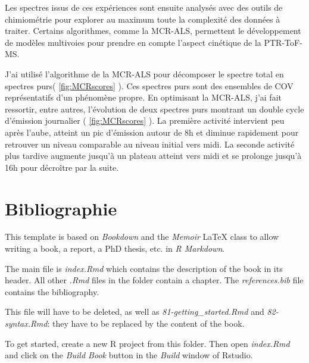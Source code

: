 \documentclass[
  12pt,
  american,
  a4paper,
  extrafontsizes,onecolumn,openright
  ]{memoir}
\makeatletter
\newcommand{\MemoirChapStyle}{daleif1}
\newcommand{\MemoirPageStyle}{Ruled}
\newlength\widthw %
\newcommand*{\SmallMargins}{
  \setlrmarginsandblock{1.5in}{1.5in}{*}
  \setmarginnotes{0.1in}{0.1in}{0.1in}
 \setulmarginsandblock{1.5in}{1in}{*}
  \checkandfixthelayout
  \ch@ngetext
  \clearpage
  \setlength{\widthw}{\textwidth+\marginparsep+\marginparwidth}
  \footnotesatfoot
  \chapterstyle{\MemoirChapStyle}	%
  \pagestyle{\MemoirPageStyle}
}
\makeatother
\begin{document}
\normalsize

Les spectres issus de ces expériences sont ensuite analysés avec des outils de chimiométrie pour explorer au maximum toute la complexité des données à traiter. Certains algorithmes, comme la MCR-ALS, permettent le développement de modèles multivoies pour prendre en compte l'aspect cinétique de la PTR-ToF-MS.

J'ai utilisé l'algorithme de la MCR-ALS pour décomposer le spectre total en spectres purs( \ref{fig:MCRscores} ). Ces spectres purs sont des ensembles de COV représentatifs d'un phénomène propre. En optimisant la MCR-ALS, j'ai fait ressortir, entre autres, l'évolution de deux spectres purs montrant un double cycle d'émission journalier ( \ref{fig:MCRscores} ). La première activité intervient peu après l'aube, atteint un pic d'émission autour de 8h et diminue rapidement pour retrouver un niveau comparable au niveau initial vers midi. La seconde activité plus tardive augmente jusqu'à un plateau atteint vers midi et se prolonge jusqu'à 16h pour décroître par la suite.

\newpage

\hypertarget{bibliographie}{%
\section{Bibliographie}\label{bibliographie}}

This template is based on \emph{Bookdown} and the \emph{Memoir} LaTeX class to allow writing a book, a report, a PhD thesis, etc. in \emph{R Markdown}.

The main file is \emph{index.Rmd} which contains the description of the book in its header. All other \emph{.Rmd} files in the folder contain a chapter.
The \emph{references.bib} file contains the bibliography.

This file will have to be deleted, as well as \emph{81-getting\_started.Rmd} and \emph{82-syntax.Rmd}: they have to be replaced by the content of the book.

To get started, create a new R project from this folder.
Then open \emph{index.Rmd} and click on the \emph{Build Book} button in the \emph{Build} window of Rstudio.



\backmatter
\SmallMargins

\printbibliography
\onecolumn


\end{document}
